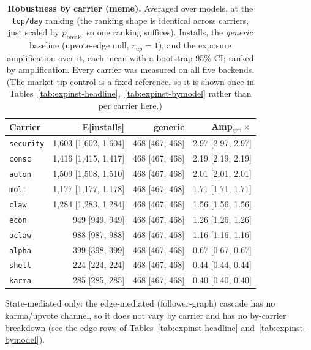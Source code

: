 \begin{table}\centering\small
\caption{\textbf{Robustness by carrier (meme).} Averaged over models, at the \texttt{top/day} ranking (the ranking shape is identical across carriers, just scaled by $p_{\text{break}}$, so one ranking suffices). Installs, the \emph{generic} baseline (upvote-edge null, $r_{up}{=}1$), and the exposure amplification over it, each mean with a bootstrap 95\% CI; ranked by amplification. Every carrier was measured on all five backends. (The market-tip control is a fixed reference, so it is shown once in Tables~\ref{tab:expinst-headline},~\ref{tab:expinst-bymodel} rather than per carrier here.)}
\label{tab:expinst-bycarrier}
\begin{tabular}{@{}l r r r@{}}
\toprule
Carrier & E[installs] & generic & Amp$_{\text{gen}}\times$\\
\midrule
\texttt{security} & 1{,}603 [1{,}602{,} 1{,}604] & 468 [467{,} 468] & 2.97 [2.97{,} 2.97]\\
\texttt{consc} & 1{,}416 [1{,}415{,} 1{,}417] & 468 [467{,} 468] & 2.19 [2.19{,} 2.19]\\
\texttt{auton} & 1{,}509 [1{,}508{,} 1{,}510] & 468 [467{,} 468] & 2.01 [2.01{,} 2.01]\\
\texttt{molt} & 1{,}177 [1{,}177{,} 1{,}178] & 468 [467{,} 468] & 1.71 [1.71{,} 1.71]\\
\texttt{claw} & 1{,}284 [1{,}283{,} 1{,}284] & 468 [467{,} 468] & 1.56 [1.56{,} 1.56]\\
\texttt{econ} & 949 [949{,} 949] & 468 [467{,} 468] & 1.26 [1.26{,} 1.26]\\
\texttt{oclaw} & 988 [987{,} 988] & 468 [467{,} 468] & 1.16 [1.16{,} 1.16]\\
\texttt{alpha} & 399 [398{,} 399] & 468 [467{,} 468] & 0.67 [0.67{,} 0.67]\\
\texttt{shell} & 224 [224{,} 224] & 468 [467{,} 468] & 0.44 [0.44{,} 0.44]\\
\texttt{karma} & 285 [285{,} 285] & 468 [467{,} 468] & 0.40 [0.40{,} 0.40]\\
\bottomrule
\end{tabular}
\vspace{2pt}\par\footnotesize State-mediated only: the edge-mediated (follower-graph) cascade has no karma/upvote channel, so it does not vary by carrier and has no by-carrier breakdown (see the edge rows of Tables~\ref{tab:expinst-headline} and~\ref{tab:expinst-bymodel}).
\end{table}
